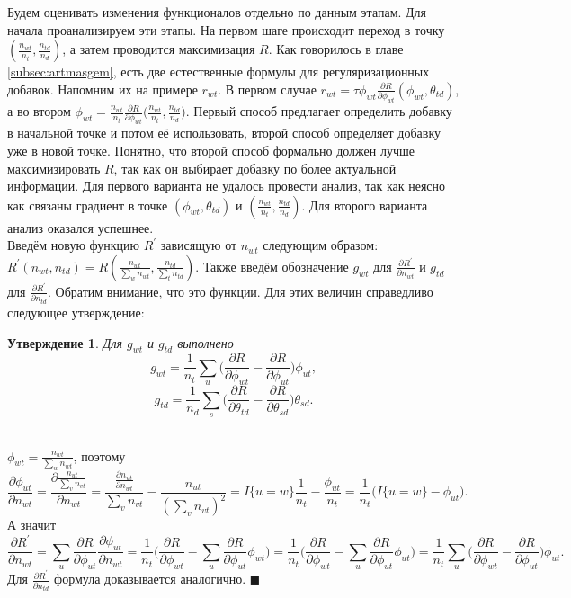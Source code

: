 \documentclass[12pt]{article}
\newtheorem{claim}[remark]{Утверждение}
\newenvironment{Proof} 
	{\par\noindent{\bf Доказательство.}} 
	{\hfill$\blacksquare$}
\begin{document}
Будем оценивать изменения функционалов отдельно по данным этапам. Для начала проанализируем эти этапы. На первом шаге происходит переход в точку $\left(\frac{n_{wt}}{n_t}, \frac{n_{td}}{n_d}\right)$, а затем проводится максимизация $R$. Как говорилось в главе \ref{subsec:artmasgem}, есть две естественные формулы для регуляризационных добавок. Напомним их на примере $r_{wt}$. В первом случае $r_{wt} = \tau\phi_{wt} \frac{\partial{R}}{\partial{\phi_{wt}}} \left( \phi_{wt}, \theta_{td}\right)$, а во втором $\phi_{wt} = \frac{n_{wt}}{n_t} \frac{\partial{R}}{\partial{\phi_{wt}}} \big(\frac{n_{wt}}{n_t}, \frac{n_{td}}{n_d}\big)$. Первый способ предлагает определить добавку в начальной точке и потом её использовать, второй способ определяет добавку уже в новой точке. Понятно, что второй способ формально должен лучше максимизировать $R$, так как он выбирает добавку по более актуальной информации. Для первого варианта не удалось провести анализ, так как неясно как связаны градиент в точке $(\phi_{wt}, \theta_{td})$ и $\left(\frac{n_{wt}}{n_t}, \frac{n_{td}}{n_d}\right)$. Для второго варианта анализ оказался успешнее.\\
Введём новую функцию $R^{\prime}$ зависящую от $n_{wt}$ следующим образом: $R^{\prime}(n_{wt}, n_{td}) = R\left( \frac{n_{wt}}{\sum\limits_w n_{wt}},  \frac{n_{td}}{\sum\limits_t n_{td}}\right)$. Также введём обозначение $g_{wt}$ для $\frac{\partial{R^{\prime}}}{\partial{n_{wt}}}$ и $g_{td}$ для $\frac{\partial{R^{\prime}}}{\partial{n_{td}}}$. Обратим внимание, что это функции. Для этих величин справедливо следующее утверждение:
\begin{claim}
\label{claimgradientvalue}           
Для $g_{wt}$ и $g_{td}$ выполнено
\[
g_{wt} = \frac{1}{n_t} \sum_{u} \bigg(\frac{\partial{R}}{\partial{\phi_{wt}}}  -  \frac{\partial{R}}{\partial{\phi_{ut}}} \bigg)  \phi_{ut} ,
\]
\[
g_{td} = \frac{1}{n_d} \sum_{s} \bigg(\frac{\partial{R}}{\partial{\theta_{td}}}  -  \frac{\partial{R}}{\partial{\theta_{sd}}} \bigg)  \theta_{sd} .
\]
\end{claim}
\begin{Proof}\\
$\phi_{wt} = \frac{n_{wt}}{\sum_w n_{wt}}$, поэтому
\[
\frac{\partial{\phi_{ut}}}{\partial{n_{wt}}} = \frac{\partial{ \frac{n_{ut}}{\sum\limits_v n_{vt}}}}{\partial{n_{wt}}} = \frac{ \frac{\partial{n_{ut}}}{\partial{n_{wt}}}}{\sum\limits_v n_{vt}} - \frac{n_{ut}}{(\sum\limits_v n_{vt})^2} = I\{u = w\} \frac{1}{n_t} - \frac{\phi_{ut}}{n_t} = \frac{1}{n_t}\bigg( 
 I\{u = w\} - \phi_{ut} \bigg).
\]
А значит
\[
\frac{\partial{R^{\prime}}}{\partial{n_{wt}}} = \sum_{u} \frac{\partial{R}}{\partial{\phi_{ut}}} \frac{\partial{\phi_{ut}}}{\partial{n_{wt}}} = \frac{1}{n_t} \bigg( \frac{\partial{R}}{\partial{\phi_{wt}}} - \sum_{u}  \frac{\partial{R}}{\partial{\phi_{ut}}} \phi_{wt} \bigg) = \frac{1}{n_t} \bigg( \frac{\partial{R}}{\partial{\phi_{wt}}} - \sum_{u}  \frac{\partial{R}}{\partial{\phi_{ut}}} \phi_{ut} \bigg) = \frac{1}{n_t} \sum_{u} \bigg(\frac{\partial{R}}{\partial{\phi_{wt}}}  -  \frac{\partial{R}}{\partial{\phi_{ut}}} \bigg)  \phi_{ut}.
\]
Для $\frac{\partial{R^{\prime}}}{\partial{n_{td}}}$ формула доказывается аналогично.
\end{Proof}\\
\end{document}
